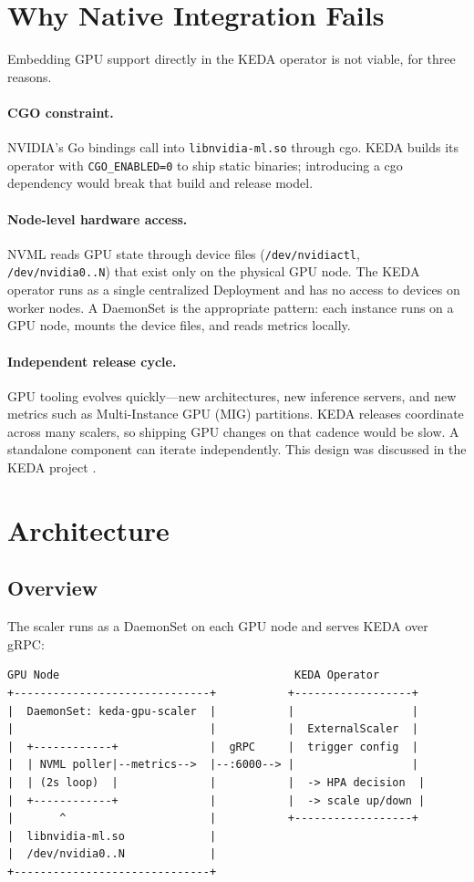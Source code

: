 \documentclass[11pt]{article}
\begin{document}
\section{Why Native Integration Fails}

Embedding GPU support directly in the KEDA operator is not viable, for three
reasons.

\paragraph{CGO constraint.} NVIDIA's Go bindings \cite{gonvml} call into
\texttt{libnvidia-ml.so} through cgo. KEDA builds its operator with
\texttt{CGO\_ENABLED=0} to ship static binaries; introducing a cgo dependency
would break that build and release model.

\paragraph{Node-level hardware access.} NVML reads GPU state through device files
(\texttt{/dev/nvidiactl}, \texttt{/dev/nvidia0..N}) that exist only on the
physical GPU node. The KEDA operator runs as a single centralized Deployment and
has no access to devices on worker nodes. A DaemonSet is the appropriate pattern:
each instance runs on a GPU node, mounts the device files, and reads metrics
locally.

\paragraph{Independent release cycle.} GPU tooling evolves quickly---new
architectures, new inference servers, and new metrics such as Multi-Instance GPU
(MIG) partitions. KEDA releases coordinate across many scalers, so shipping GPU
changes on that cadence would be slow. A standalone component can iterate
independently. This design was discussed in the KEDA project \cite{keda7538}.

\section{Architecture}

\subsection{Overview}
The scaler runs as a DaemonSet on each GPU node and serves KEDA over gRPC:

\begin{Verbatim}[fontsize=\small]
GPU Node                                    KEDA Operator
+------------------------------+           +------------------+
|  DaemonSet: keda-gpu-scaler  |           |                  |
|                              |           |  ExternalScaler  |
|  +------------+              |  gRPC     |  trigger config  |
|  | NVML poller|--metrics-->  |--:6000--> |                  |
|  | (2s loop)  |              |           |  -> HPA decision  |
|  +------------+              |           |  -> scale up/down |
|       ^                      |           +------------------+
|  libnvidia-ml.so             |
|  /dev/nvidia0..N             |
+------------------------------+
\end{Verbatim}
\end{document}
